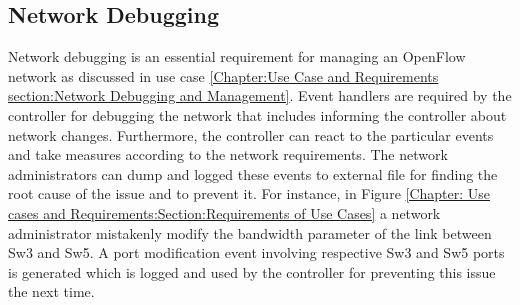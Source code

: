 
\subsection{Network Debugging}

Network debugging is an essential requirement for managing an OpenFlow network as discussed in use case \ref{Chapter:Use Case and Requirements section:Network Debugging and Management}. Event handlers are required by the controller for debugging the network that includes informing the controller about network changes. Furthermore, the controller can react to the particular events and take measures according to the network requirements. The network administrators can dump and logged these events to external file for finding the root cause of the issue and to prevent it. For instance, in Figure \ref{Chapter: Use cases and Requirements:Section:Requirements of Use Cases} a network administrator mistakenly modify the bandwidth parameter of the link between Sw3 and Sw5. A port modification event involving respective Sw3 and Sw5 ports is generated which is logged and used by the controller for preventing this issue the next time.




 
